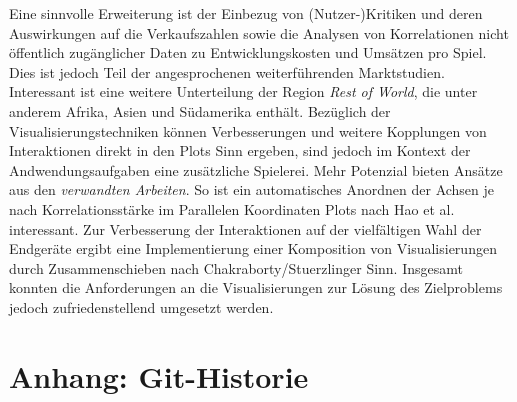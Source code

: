 \documentclass[usegeometry=true]{scrartcl}
\begin{document}
Eine sinnvolle Erweiterung ist der Einbezug von (Nutzer-)Kritiken und deren Auswirkungen auf die Verkaufszahlen 
sowie die Analysen von Korrelationen nicht öffentlich zugänglicher Daten zu Entwicklungskosten und Umsätzen pro Spiel.
Dies ist jedoch Teil der angesprochenen weiterführenden Marktstudien.
Interessant ist eine weitere Unterteilung der Region \textit{Rest of World}, die unter anderem Afrika, Asien und Südamerika enthält.
Bezüglich der Visualisierungstechniken können Verbesserungen und weitere Kopplungen von Interaktionen direkt in den Plots Sinn ergeben, 
sind jedoch im Kontext der Andwendungsaufgaben eine zusätzliche Spielerei.
Mehr Potenzial bieten Ansätze aus den \textit{verwandten Arbeiten}. 
So ist ein automatisches Anordnen der Achsen je nach Korrelationsstärke im Parallelen Koordinaten Plots nach Hao et al. interessant.\cite{Hao.2007}
Zur Verbesserung der Interaktionen auf der vielfältigen Wahl der Endgeräte ergibt eine Implementierung einer Komposition von Visualisierungen durch Zusammenschieben nach Chakraborty/Stuerzlinger Sinn.\cite{Chakraborty.2021}
Insgesamt konnten die Anforderungen an die Visualisierungen zur Lösung des Zielproblems jedoch zufriedenstellend umgesetzt werden.
\newpage
\section*{Anhang: Git-Historie}

\printbibliography
\end{document}
